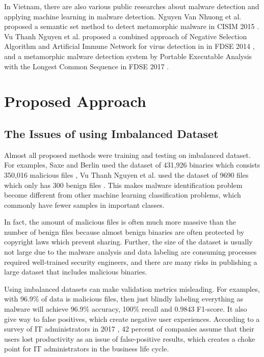 \documentclass[runningheads]{llncs}
\begin{document}
In Vietnam, there are also various public researches about malware detection and applying machine learning in malware detection. Nguyen Van Nhuong et al. proposed a semantic set method to detect metamorphic malware in CISIM 2015 \cite{van2014semantic}. Vu Thanh Nguyen et al. proposed a combined approach of Negative Selection Algorithm and Artificial Immune Network for virus detection in in FDSE 2014 \cite{nguyen2014combination}, and a metamorphic malware detection system by Portable Executable Analysis with the Longest Common Sequence in FDSE 2017 \cite{vu2017metamorphic}.

\section{Proposed Approach}

\subsection{The Issues of using Imbalanced Dataset}

Almost all proposed methods were training and testing on imbalanced dataset. For examples, Saxe and Berlin used the dataset of 431,926 binaries which consists 350,016 malicious files \cite{saxe2015deep}, Vu Thanh Nguyen et al. used the dataset of 9690 files which only has 300 benign files \cite{vu2017metamorphic}. This makes malware identification problem become different from other machine learning classification problems, which commonly have fewer samples in important classes.

In fact, the amount of malicious files is often much more massive than the number of benign files because almost benign binaries are often protected by copyright laws which prevent sharing. Further, the size of the dataset is usually not large due to the malware analysis and data labeling are consuming processes required well-trained security engineers, and there are many risks in publishing a large dataset that includes malicious binaries.

Using imbalanced datasets can make validation metrics misleading. For examples, with 96.9\% of data is malicious files, then just blindly labeling everything as malware will achieve 96.9\% accuracy, 100\% recall and 0.9843 F1-score. It also give way to false positives, which create negative user experiences. According to a survey of IT administrators in 2017 \cite{jonathan2017survey}, 42 percent of companies assume that their users lost productivity as an issue of false-positive results, which creates a choke point for IT administrators in the business life cycle.
\end{document}
